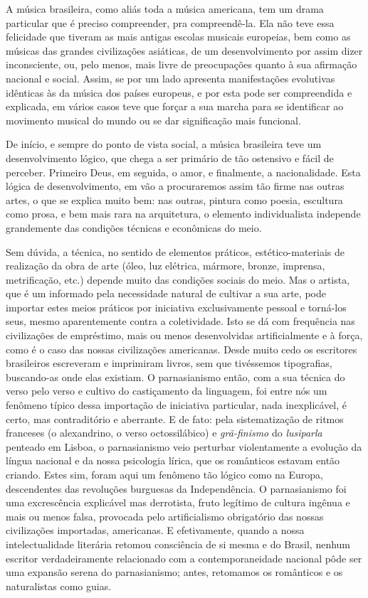 A música brasileira, como aliás toda a música americana, tem um drama
particular que é preciso compreender, pra compreendê-la. Ela não teve
essa felicidade que tiveram as mais antigas escolas musicais europeias,
bem como as músicas das grandes civilizações asiáticas, de um
desenvolvimento por assim dizer inconsciente, ou, pelo menos, mais livre
de preocupações quanto à sua afirmação nacional e social. Assim, se por
um lado apresenta manifestações evolutivas idênticas às da música dos
países europeus, e por esta pode ser compreendida e explicada, em vários
casos teve que forçar a sua marcha para se identificar ao movimento
musical do mundo ou se dar significação mais funcional.

De início, e sempre do ponto de vista social, a música brasileira teve
um desenvolvimento lógico, que chega a ser primário de tão ostensivo e
fácil de perceber. Primeiro Deus, em seguida, o amor, e finalmente, a
nacionalidade. Esta lógica de desenvolvimento, em vão a procuraremos
assim tão firme nas outras artes, o que se explica muito bem: nas
outras, pintura como poesia, escultura como prosa, e bem mais rara na
arquitetura, o elemento individualista independe grandemente das
condições técnicas e econômicas do meio.

Sem dúvida, a técnica, no sentido de elementos práticos,
estético-materiais de realização da obra de arte (óleo, luz elétrica,
mármore, bronze, imprensa, metrificação, etc.) depende muito das
condições sociais do meio. Mas o artista, que é um informado pela
necessidade natural de cultivar a sua arte, pode importar estes meios
práticos por iniciativa exclusivamente pessoal e torná-los seus, mesmo
aparentemente contra a coletividade. Isto se dá com frequência nas
civilizações de empréstimo, mais ou menos desenvolvidas artificialmente
e à força, como é o caso das nossas civilizações americanas. Desde muito
cedo os escritores brasileiros escreveram e imprimiram livros, sem que
tivéssemos tipografias, buscando-as onde elas existiam. O parnasianismo
então, com a sua técnica do verso pelo verso e cultivo do castiçamento
da linguagem, foi entre nós um fenômeno típico dessa importação de
iniciativa particular, nada inexplicável, é certo, mas contraditório e
aberrante. E de fato: pela sistematização de ritmos franceses (o
alexandrino, o verso octossilábico) e \textit{grã-finismo} do \textit{lusiparla} penteado
em Lisboa, o parnasianismo veio perturbar violentamente a evolução da
língua nacional e da nossa psicologia lírica, que os românticos estavam
então criando. Estes sim, foram aqui um fenômeno tão lógico como na
Europa, descendentes das revoluções burguesas da Independência. O
parnasianismo foi uma excrescência explicável mas derrotista, fruto
legítimo de cultura ingênua e mais ou menos falsa, provocada pelo
artificialismo obrigatório das nossas civilizações importadas,
americanas. E efetivamente, quando a nossa intelectualidade literária
retomou consciência de si mesma e do Brasil, nenhum escritor
verdadeiramente relacionado com a contemporaneidade nacional pôde ser
uma expansão serena do parnasianismo; antes, retomamos os românticos e
os naturalistas como guias.

